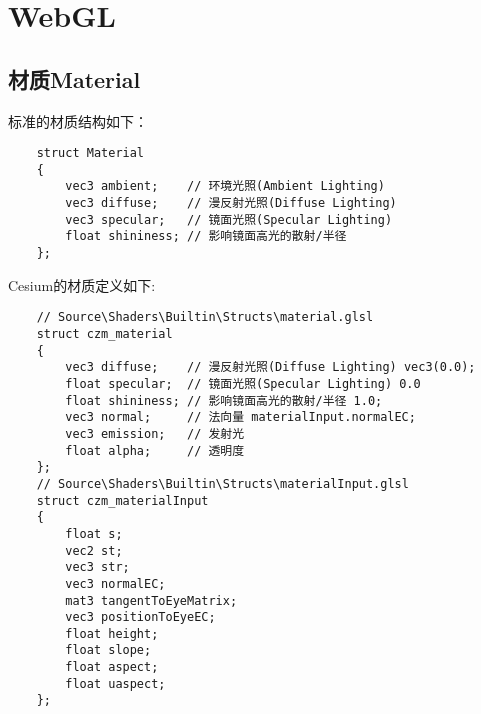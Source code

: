 \chapter{WebGL}

\section{材质Material}

标准的材质结构如下：
\begin{lstlisting}
    struct Material
    {
        vec3 ambient;    // 环境光照(Ambient Lighting)
        vec3 diffuse;    // 漫反射光照(Diffuse Lighting)
        vec3 specular;   // 镜面光照(Specular Lighting)
        float shininess; // 影响镜面高光的散射/半径
    };
\end{lstlisting}

Cesium的材质定义如下: 
\begin{lstlisting}
    // Source\Shaders\Builtin\Structs\material.glsl    
    struct czm_material
    {
        vec3 diffuse;    // 漫反射光照(Diffuse Lighting) vec3(0.0);
        float specular;  // 镜面光照(Specular Lighting) 0.0
        float shininess; // 影响镜面高光的散射/半径 1.0;
        vec3 normal;     // 法向量 materialInput.normalEC;
        vec3 emission;   // 发射光
        float alpha;     // 透明度
    };
    // Source\Shaders\Builtin\Structs\materialInput.glsl
    struct czm_materialInput  
    {
        float s;
        vec2 st;
        vec3 str;
        vec3 normalEC;
        mat3 tangentToEyeMatrix;
        vec3 positionToEyeEC;
        float height;
        float slope;
        float aspect;
        float uaspect;
    };
\end{lstlisting}    

